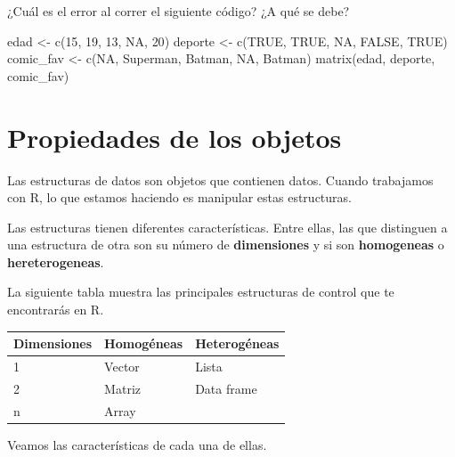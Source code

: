\documentclass[
]{book}
\newenvironment{Shaded}{\begin{snugshade}}{\end{snugshade}}
\newcommand{\ConstantTok}[1]{\textcolor[rgb]{0.00,0.00,0.00}{#1}}
\newcommand{\DecValTok}[1]{\textcolor[rgb]{0.00,0.00,0.81}{#1}}
\newcommand{\FunctionTok}[1]{\textcolor[rgb]{0.00,0.00,0.00}{#1}}
\newcommand{\NormalTok}[1]{#1}
\newcommand{\OtherTok}[1]{\textcolor[rgb]{0.56,0.35,0.01}{#1}}
\newcommand{\StringTok}[1]{\textcolor[rgb]{0.31,0.60,0.02}{#1}}
\begin{document}
¿Cuál es el error al correr el siguiente código? ¿A qué se debe?

\begin{Shaded}
\begin{Highlighting}[]
\NormalTok{edad }\OtherTok{\textless{}{-}} \FunctionTok{c}\NormalTok{(}\DecValTok{15}\NormalTok{, }\DecValTok{19}\NormalTok{, }\DecValTok{13}\NormalTok{, }\ConstantTok{NA}\NormalTok{, }\DecValTok{20}\NormalTok{)}
\NormalTok{deporte }\OtherTok{\textless{}{-}} \FunctionTok{c}\NormalTok{(}\ConstantTok{TRUE}\NormalTok{, }\ConstantTok{TRUE}\NormalTok{, }\ConstantTok{NA}\NormalTok{, }\ConstantTok{FALSE}\NormalTok{, }\ConstantTok{TRUE}\NormalTok{)}
\NormalTok{comic\_fav }\OtherTok{\textless{}{-}} \FunctionTok{c}\NormalTok{(}\ConstantTok{NA}\NormalTok{, }\StringTok{\textquotesingle{}Superman\textquotesingle{}}\NormalTok{, }\StringTok{\textquotesingle{}Batman\textquotesingle{}}\NormalTok{, }\ConstantTok{NA}\NormalTok{, }\StringTok{\textquotesingle{}Batman\textquotesingle{}}\NormalTok{)}
\FunctionTok{matrix}\NormalTok{(edad, deporte, comic\_fav)}
\end{Highlighting}
\end{Shaded}

\hypertarget{propiedades-de-los-objetos}{%
\chapter{Propiedades de los objetos}\label{propiedades-de-los-objetos}}

Las estructuras de datos son objetos que contienen datos. Cuando trabajamos con R, lo que estamos haciendo es manipular estas estructuras.

Las estructuras tienen diferentes características. Entre ellas, las que distinguen a una estructura de otra son su número de \textbf{dimensiones} y si son \textbf{homogeneas} o \textbf{hereterogeneas}.

La siguiente tabla muestra las principales estructuras de control que te encontrarás en R.

\begin{longtable}[]{@{}lll@{}}
\toprule()
Dimensiones & Homogéneas & Heterogéneas \\
\midrule()
\endhead
1 & Vector & Lista \\
2 & Matriz & Data frame \\
n & Array & \\
\bottomrule()
\end{longtable}

Veamos las características de cada una de ellas.
\end{document}
